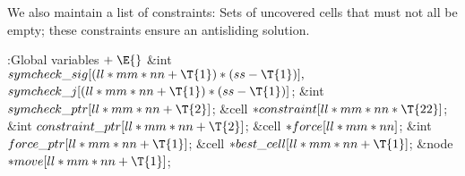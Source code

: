 We also maintain a list of constraints: Sets of uncovered cells that must not
all be empty; these constraints ensure an antisliding solution.

\Y\B\4:Global variables\X${}\mathrel+\E{}$\6
\&{int} ${}\\{symcheck\_sig}[(\\{ll}*\\{mm}*\\{nn}+\T{1})*(\\{ss}-\T{1})],{}$
${}\\{symcheck\_j}[(\\{ll}*\\{mm}*\\{nn}+\T{1})*(\\{ss}-\T{1})]{}$;\6
\&{int} ${}\\{symcheck\_ptr}[\\{ll}*\\{mm}*\\{nn}+\T{2}]{}$;\6
\&{cell} ${}{*}\\{constraint}[\\{ll}*\\{mm}*\\{nn}*\T{22}]{}$;\6
\&{int} ${}\\{constraint\_ptr}[\\{ll}*\\{mm}*\\{nn}+\T{2}]{}$;\6
\&{cell} ${}{*}\\{force}[\\{ll}*\\{mm}*\\{nn}]{}$;\6
\&{int} ${}\\{force\_ptr}[\\{ll}*\\{mm}*\\{nn}+\T{1}]{}$;\6
\&{cell} ${}{*}\\{best\_cell}[\\{ll}*\\{mm}*\\{nn}+\T{1}]{}$;\6
\&{node} ${}{*}\\{move}[\\{ll}*\\{mm}*\\{nn}+\T{1}]{}$;\par
\fi

